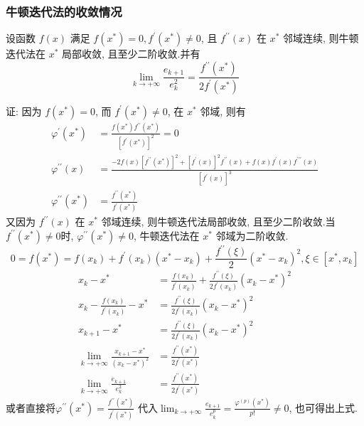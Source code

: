 \subsubsection{牛顿迭代法的收敛情况}
\begin{tcolorbox}[enhanced,colback=2,colframe=1,breakable,coltitle=black,title=定理]
 设函数 $ f(x) $ 满足 $ f\left(x^{*}\right)=0, f^{\prime}\left(x^{*}\right) \neq 0 $, 且 $ f^{\prime \prime}(x) $ 在 $ x^{*} $ 邻域连续, 则牛顿迭代法在 $ x^{*} $ 局部收敛, 且至少二阶收敛.并有
$$
\lim _{k \rightarrow+\infty} \frac{e_{k+1}}{e_{k}^{2}}=\frac{f^{\prime \prime}\left(x^{*}\right)}{2 f^{\prime}\left(x^{*}\right)}
$$
\end{tcolorbox}
证: 因为 $ f\left(x^{*}\right)=0 $, 而 $ f^{\prime}\left(x^{*}\right) \neq 0 $, 在 $ x^{*} $ 邻域, 则有
$$
\begin{aligned}
\varphi^{\prime}\left(x^{*}\right)&=\frac{f\left(x^{*}\right) f^{\prime \prime}\left(x^{*}\right)}{\left[f^{\prime}\left(x^{*}\right)\right]^{2}}=0 \\
\varphi^{\prime \prime}(x)&=\frac{-2 f(x)\left[f^{\prime \prime}\left(x^{*}\right)\right]^{2}+\left[f^{\prime}(x)\right]^{2} f^{\prime \prime}(x)+f(x) f^{\prime}(x) f^{\prime \prime \prime}(x)}{\left[f^{\prime}(x)\right]^{3}} \\
\varphi^{\prime \prime}\left(x^{*}\right)&=\frac{f^{\prime \prime}\left(x^{*}\right)}{f^{\prime}\left(x^{*}\right)}
\end{aligned}
$$
又因为 $ f^{\prime \prime}(x) $ 在 $ x^{*} $ 邻域连续, 则牛顿迭代法局部收敛, 且至少二阶收敛.当 $ f^{\prime \prime}\left(x^{*}\right) \neq 0 $时, $ \varphi^{\prime \prime}\left(x^{*}\right) \neq 0 $, 牛顿迭代法在 $ x^{*} $ 邻域为二阶收敛.
$$0=f\left(x^{*}\right)=f\left(x_{k}\right)+f^{\prime}\left(x_{k}\right)\left(x^{*}-x_{k}\right)+\frac{f^{\prime \prime}(\xi)}{2}\left(x^{*}-x_{k}\right)^{2}, \xi \in\left[x^{*}, x_{k}\right] $$
$$
\begin{aligned}
x_{k}-x^{*}&=\frac{f\left(x_{k}\right)}{f^{\prime}\left(x_{k}\right)}+\frac{f^{\prime \prime}(\xi)}{2 f^{\prime}\left(x_{k}\right)}\left(x_{k}-x^{*}\right)^{2} \\
x_{k}-\frac{f\left(x_{k}\right)}{f^{\prime}\left(x_{k}\right)}-x^{*}&=\frac{f^{\prime \prime}(\xi)}{2 f^{\prime}\left(x_{k}\right)}\left(x_{k}-x^{*}\right)^{2} \\
x_{k+1}-x^{*}&=\frac{f^{\prime \prime}(\xi)}{2 f^{\prime}\left(x_{k}\right)}\left(x_{k}-x^{*}\right)^{2} \\
\lim _{k \rightarrow+\infty} \frac{x_{k+1}-x^{*}}{\left(x_{k}-x^{*}\right)^{2}}&=\frac{f^{\prime \prime}\left(x^{*}\right)}{2 f^{\prime}\left(x^{*}\right)} \\
\lim _{k \rightarrow+\infty} \frac{e_{k+1}}{e_{k}^{2}}&=\frac{f^{\prime \prime}\left(x^{*}\right)}{2 f^{\prime}\left(x^{*}\right)}
\end{aligned}
$$
或者直接将$\displaystyle\varphi^{\prime \prime}\left(x^{*}\right)=\frac{f^{\prime \prime}\left(x^{*}\right)}{f^{\prime}\left(x^{*}\right)}$ 代入$\displaystyle \lim _{k \rightarrow+\infty} \frac{e_{k+1}}{e_{k}^{p}}=\frac{\varphi^{(p)}\left(x^{*}\right)}{p!} \neq 0 $, 也可得出上式.

